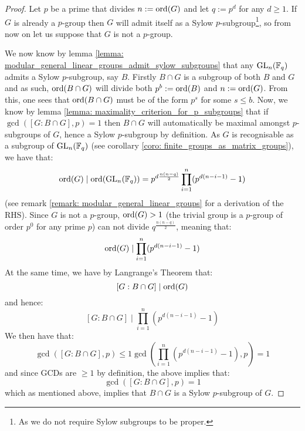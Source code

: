            \begin{proof}
                Let $p$ be a prime that divides $n := \operatorname{ord}(G)$ and let $q := p^d$ for any $d \geq 1$. If $G$ is already a $p$-group then $G$ will admit itself as a Sylow $p$-subgroup\footnote{As we do not require Sylow subgroups to be proper.}, so from now on let us suppose that $G$ is not a $p$-group.
                
                We now know by lemma \ref{lemma: modular_general_linear_groups_admit_sylow_subgroups} that any $\mathrm{GL}_n(\mathbb{F}_q)$ admits a Sylow $p$-subgroup, say $B$. Firstly $B \cap G$ is a subgroup of both $B$ and $G$ and as such, $\operatorname{ord}(B \cap G)$ will divide both $p^b := \operatorname{ord}(B)$ and $n := \operatorname{ord}(G)$. From this, one sees that $\operatorname{ord}(B \cap G)$ must be of the form $p^s$ for some $s \leq b$. Now, we know by lemma \ref{lemma: maximality_criterion_for_p_subgroups} that if $\gcd( [G : B \cap G], p ) = 1$ then $B \cap G$ will automatically be maximal amongst $p$-subgroups of $G$, hence a Sylow $p$-subgroup by definition. As $G$ is recognisable as a subgroup of $\mathrm{GL}_n(\mathbb{F}_q)$ (see corollary \ref{coro: finite_groups_as_matrix_groups}), we have that:
                    $$\operatorname{ord}(G) \mid \operatorname{ord}(\mathrm{GL}_n(\mathbb{F}_q)) = p^{d \frac{n(n - q)}{2}} \prod_{i = 1}^n (p^{d(n - i - 1)} - 1)$$
                (see remark \ref{remark: modular_general_linear_groups} for a derivation of the RHS). Since $G$ is not a $p$-group, $\operatorname{ord}(G) > 1$ (the trivial group is a $p$-group of order $p^0$ for any prime $p$) can not divide $q^{\frac{n(n - q)}{2}}$, meaning that:
                    $$\operatorname{ord}(G) \mid \prod_{i = 1}^n (p^{d(n - i - 1)} - 1)$$
                At the same time, we have by Langrange's Theorem that:
                    $$[G : B \cap G] \mid \operatorname{ord}(G)$$
                and hence:
                    $$[G : B \cap G] \mid \prod_{i = 1}^n (p^{d(n - i - 1)} - 1)$$
                We then have that:
                    $$\gcd( [G : B \cap G], p ) \leq 1 \gcd( \prod_{i = 1}^n (p^{d(n - i - 1)} - 1), p ) = 1$$
                and since GCDs are $\geq 1$ by definition, the above implies that:
                    $$\gcd( [G : B \cap G], p ) = 1$$
                which as mentioned above, implies that $B \cap G$ is a Sylow $p$-subgroup of $G$.
            \end{proof}

